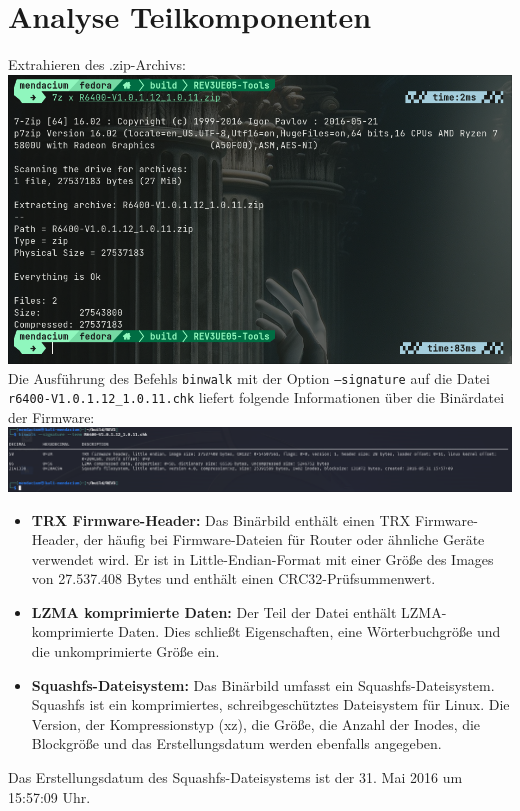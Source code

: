 \documentclass{article}
\begin{document}
	\section*{Analyse Teilkomponenten}
	Extrahieren des .zip-Archivs:\\
	\includegraphics[width=0.5\linewidth]{"pictures/1.1 Extract.png"}\\
	Die Ausführung des Befehls \texttt{binwalk} mit der Option \texttt{--signature} auf die Datei \texttt{r6400-V1.0.1.12\_1.0.11.chk} liefert folgende Informationen über die Binärdatei der Firmware:\\
	\includegraphics[width=1\linewidth]{"pictures/1.2 signature.png"}\\
	\begin{itemize}
		\item \textbf{TRX Firmware-Header:} Das Binärbild enthält einen TRX Firmware-Header, der häufig bei Firmware-Dateien für Router oder ähnliche Geräte verwendet wird. Er ist in Little-Endian-Format mit einer Größe des Images von 27.537.408 Bytes und enthält einen CRC32-Prüfsummenwert.
		
		\item \textbf{LZMA komprimierte Daten:} Der Teil der Datei enthält LZMA-komprimierte Daten. Dies schließt Eigenschaften, eine Wörterbuchgröße und die unkomprimierte Größe ein.
		
		\item \textbf{Squashfs-Dateisystem:} Das Binärbild umfasst ein Squashfs-Dateisystem. Squashfs ist ein komprimiertes, schreibgeschütztes Dateisystem für Linux. Die Version, der Kompressionstyp (xz), die Größe, die Anzahl der Inodes, die Blockgröße und das Erstellungsdatum werden ebenfalls angegeben.
	\end{itemize}
	Das Erstellungsdatum des Squashfs-Dateisystems ist der 31. Mai 2016 um 15:57:09 Uhr.\\
	
\end{document}

